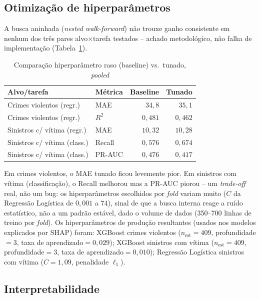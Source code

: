 \documentclass[12pt]{article}
\begin{document}
\subsection{Otimização de hiperparâmetros}

A busca aninhada (\emph{nested walk-forward}) não trouxe ganho
consistente em nenhum dos três pares alvo$\times$tarefa testados --
achado metodológico, não falha de implementação
(Tabela~\ref{tab:tuning}).

\begin{table}[ht]
\centering
\caption{Comparação hiperparâmetro raso (baseline) vs.\ tunado, \emph{pooled}}
\label{tab:tuning}
\small
\begin{tabular}{@{}llrr@{}}
\toprule
\textbf{Alvo/tarefa} & \textbf{Métrica} & \textbf{Baseline} & \textbf{Tunado} \\
\midrule
Crimes violentos (regr.)     & MAE   & $34,8$  & $35,1$ \\
Crimes violentos (regr.)     & $R^2$ & $0,481$ & $0,462$ \\
Sinistros c/ vítima (regr.)  & MAE   & $10,32$ & $10,28$ \\
Sinistros c/ vítima (class.) & Recall & $0,576$ & $0,674$ \\
Sinistros c/ vítima (class.) & PR-AUC & $0,476$ & $0,417$ \\
\bottomrule
\end{tabular}
\end{table}

Em crimes violentos, o MAE tunado ficou levemente pior. Em sinistros com
vítima (classificação), o Recall melhorou mas a PR-AUC piorou -- um
\emph{trade-off} real, não um bug: os hiperparâmetros escolhidos por
\emph{fold} variam muito ($C$ da Regressão Logística de $0,001$ a $74$),
sinal de que a busca interna reage a ruído estatístico, não a um padrão
estável, dado o volume de dados (350--700 linhas de treino por
\emph{fold}). Os hiperparâmetros de produção resultantes (usados nos
modelos explicados por SHAP) foram: XGBoost crimes violentos
($n_{\text{est}}=409$, profundidade$=3$, taxa de aprendizado$=0,029$);
XGBoost sinistros com vítima ($n_{\text{est}}=409$, profundidade$=3$,
taxa de aprendizado$=0,010$); Regressão Logística sinistros com vítima
($C=1,09$, penalidade $\ell_1$).

\subsection{Interpretabilidade}
\label{sec:interpretabilidade}
\end{document}
